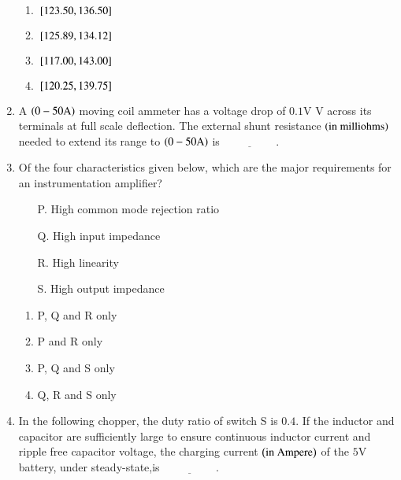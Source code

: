 \documentclass[journal]{IEEEtran}
\begin{document}
\begin{enumerate}
\begin{figure}[H]
\label{fig:my_label}
\end{figure}
\begin{enumerate}
        \item ${}\left[123.50,136.50\right]$
        \item ${}\left[125.89,134.12\right]$
        \item ${}\left[117.00,143.00\right]$
        \item ${}\left[120.25,139.75\right]$
\end{enumerate}
\bigskip
\item A $\left(0-50\text{A}\right)$ moving coil ammeter has a voltage drop of $0.1$V V across its terminals at full scale deflection. The external shunt resistance $\left(\text{in milliohms}\right)$ needed to extend its range to $\left(0-50\text{A}\right)$ is $\underline{\hspace{2cm}}.$
\bigskip
\item Of the four characteristics given below, which are the major requirements for an instrumentation amplifier? 
\begin{enumerate}[label=\Alph*]
    \item[P.] High common mode rejection ratio
    \item[Q.] High input impedance
    \item[R.] High linearity
    \item[S.] High output impedance
\end{enumerate}
\begin{multicols}{2}
    \begin{enumerate}
        \item P, Q and R only
        \item P and R only
        \item P, Q and S only
        \item Q, R and S only
    \end{enumerate}
\end{multicols}
\bigskip
\item In the following chopper, the duty ratio of switch S is $0.4$. If the inductor and capacitor are sufficiently large to ensure continuous inductor current and ripple free capacitor voltage, the charging current $\left(\text{in Ampere}\right)$ of the $5$V battery, under steady-state,is $\underline{\hspace{2cm}}.$
\begin{figure}[H]
\centering
{}
\end{figure}
\end{enumerate}
\end{document}
